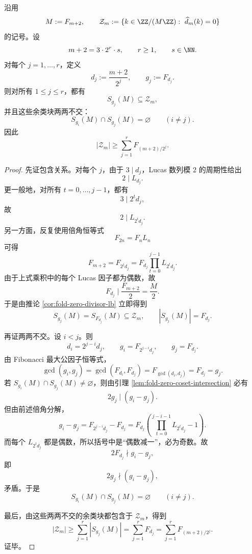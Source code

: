 \begin{theorem}\label{thm:xi-fold-zero-dyadic-tower-disjoint-fibonacci-cosets}
沿用
\[
M:=F_{m+2},
\qquad
\mathcal Z_m:=\{k\in \ZZ/(M\ZZ):\ \widehat d_m(k)=0\}
\]
的记号。设
\[
m+2=3\cdot 2^r\cdot s,
\qquad
r\ge 1,
\qquad
s\in \NN.
\]
对每个 \(j=1,\dots,r\)，定义
\[
d_j:=\frac{m+2}{2^j},
\qquad
g_j:=F_{d_j}.
\]
则对所有 \(1\le j\le r\)，都有
\[
S_{g_j}(M)\subseteq \mathcal Z_m,
\]
并且这些余类块两两不交：
\[
S_{g_i}(M)\cap S_{g_j}(M)=\varnothing
\qquad(i\neq j).
\]
因此
\[
\boxed{\;
|\mathcal Z_m|
\ge
\sum_{j=1}^{r}F_{(m+2)/2^j}.\;}
\]
\end{theorem}
\begin{proof}
先证包含关系。对每个 \(j\)，由于 \(3\mid d_j\)，Lucas 数列模 \(2\) 的周期性给出
\[
2\mid L_{d_j}.
\]
更一般地，对所有 \(t=0,\dots,j-1\)，都有
\[
3\mid 2^t d_j,
\]
故
\[
2\mid L_{2^t d_j}.
\]
另一方面，反复使用倍角恒等式
\[
F_{2n}=F_nL_n
\]
可得
\[
F_{m+2}
=
F_{2^j d_j}
=
F_{d_j}\prod_{t=0}^{j-1}L_{2^t d_j}.
\]
由于上式乘积中的每个 Lucas 因子都为偶数，故
\[
F_{d_j}\mid \frac{F_{m+2}}{2}=\frac{M}{2}.
\]
于是由推论 \ref{cor:fold-zero-divisor-lb} 立即得到
\[
S_{g_j}(M)=S_{F_{d_j}}(M)\subseteq \mathcal Z_m,
\qquad
|S_{g_j}(M)|=F_{d_j}.
\]

再证两两不交。设 \(i<j\)。则
\[
d_i=2^{j-i}d_j,
\qquad
g_i=F_{2^{j-i}d_j},
\qquad
g_j=F_{d_j}.
\]
由 Fibonacci 最大公因子恒等式，
\[
\gcd(g_i,g_j)
=
\gcd(F_{d_i},F_{d_j})
=
F_{\gcd(d_i,d_j)}
=
F_{d_j}
=
g_j.
\]
若 \(S_{g_i}(M)\cap S_{g_j}(M)\neq\varnothing\)，则由引理 \ref{lem:fold-zero-coset-intersection} 必有
\[
2g_j\mid (g_i-g_j).
\]
但由前述倍角分解，
\[
g_i-g_j
=
F_{2^{j-i}d_j}-F_{d_j}
=
F_{d_j}\left(\prod_{t=0}^{j-i-1}L_{2^t d_j}-1\right).
\]
而每个 \(L_{2^t d_j}\) 都是偶数，所以括号中是“偶数减一”，必为奇数。故
\[
2F_{d_j}\nmid g_i-g_j,
\]
即
\[
2g_j\nmid (g_i-g_j),
\]
矛盾。于是
\[
S_{g_i}(M)\cap S_{g_j}(M)=\varnothing
\qquad(i\neq j).
\]

最后，由这些两两不交的余类块都包含于 \(\mathcal Z_m\)，得到
\[
|\mathcal Z_m|
\ge
\sum_{j=1}^{r}|S_{g_j}(M)|
=
\sum_{j=1}^{r}F_{d_j}
=
\sum_{j=1}^{r}F_{(m+2)/2^j}.
\]
证毕。
\end{proof}

